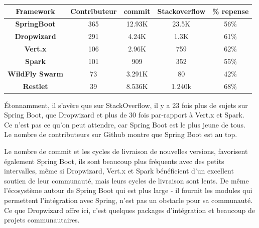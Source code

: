 \documentclass[12pt, a4paper, openany]{report}
\begin{document}
   \begin{center}
   \begin{tabular}{|c|c|c|c|c|}
    \hline
    
    \rowcolor[rgb]{0.5,0.5,0}\textbf{Framework}&\textbf{Contributeur}&\textbf{commit}&\textbf{Stackoverflow}&\textbf{\% repense} \\ \hline
    
    \textbf{SpringBoot} & 365 & 12.93K & 23.5K & 56\% \\ \hline
     
    \textbf{Dropwizard} & 291 & 4.24K & 1.3K & 61\% \\ \hline
     
     \textbf{Vert.x} & 106 & 2.96K & 759 & 62\%\\ \hline
     
     \textbf{Spark} & 101 & 909 & 352 & 55\% \\ \hline
     
     \textbf{WildFly Swarm} & 73 & 3.291K & 80 & 42\% \\ \hline
     
     \textbf{Restlet} & 39 & 8.536K & 1.240k & 68\% \\ \hline
     
   \end{tabular}
   \label{tab2}
   \end{center}
   
   
   
   Étonnamment, il s'avère que sur StackOverflow, il y a 23 fois plus de sujets sur Spring Boot, que Dropwizard et plus de 30 fois par-rapport à Vert.x et Spark.\\
   Ce n'est pas ce qu'on peut attendre, car Spring Boot est le plus jeune de tous.\\
   
   Le nombre de contributeurs sur Github montre que Spring Boot est au top.
   
   Le nombre de commit et les cycles de livraison de nouvelles versions, favorisent également Spring Boot, ils sont beaucoup plus fréquents avec des petits intervalles, même si Dropwizard, Vert.x et Spark bénéficient d'un excellent soutien de leur communauté, mais leurs cycles de livraison sont lents. De même l'écosystème autour de Spring Boot qui est plus large - il fournit les modules qui permettent l'intégration avec Spring, n'est pas un obstacle pour sa communauté.
   Ce que Dropwizard offre ici, c'est quelques packages d'intégration et beaucoup de projets communautaires.\\
  
\end{document}
